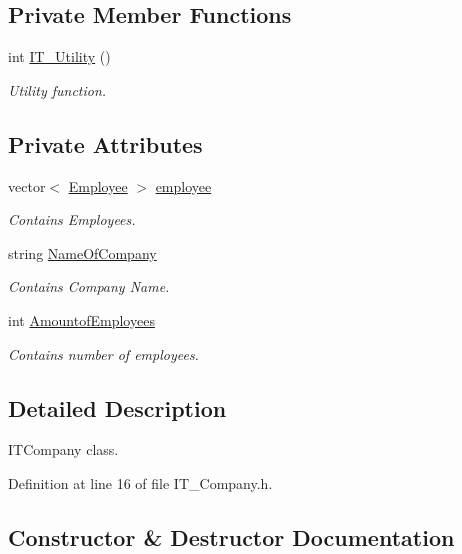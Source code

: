 \subsection*{Private Member Functions}
\begin{DoxyCompactItemize}
\item 
int \hyperlink{class_i_t___company_a06d2d0d74d96533e474618fb92291c04}{I\+T\+\_\+\+Utility} ()
\begin{DoxyCompactList}\small\item\em Utility function. \end{DoxyCompactList}\end{DoxyCompactItemize}
\subsection*{Private Attributes}
\begin{DoxyCompactItemize}
\item 
vector$<$ \hyperlink{class_employee}{Employee} $>$ \hyperlink{class_i_t___company_a26c2bb58e3f36ccc1fcfeebe651a29d2}{employee}
\begin{DoxyCompactList}\small\item\em Contains Employees. \end{DoxyCompactList}\item 
string \hyperlink{class_i_t___company_a2c19371df703f0aa969aaf8bfba32874}{Name\+Of\+Company}
\begin{DoxyCompactList}\small\item\em Contains Company Name. \end{DoxyCompactList}\item 
int \hyperlink{class_i_t___company_a5a839f7995a47589d983fd1990c06a0a}{Amountof\+Employees}
\begin{DoxyCompactList}\small\item\em Contains number of employees. \end{DoxyCompactList}\end{DoxyCompactItemize}


\subsection{Detailed Description}
I\+T\+Company class. 

Definition at line 16 of file I\+T\+\_\+\+Company.\+h.



\subsection{Constructor \& Destructor Documentation}
\mbox{\label{class_i_t___company_a13bea9468214205bd5b4b57c6174de9a}} 
